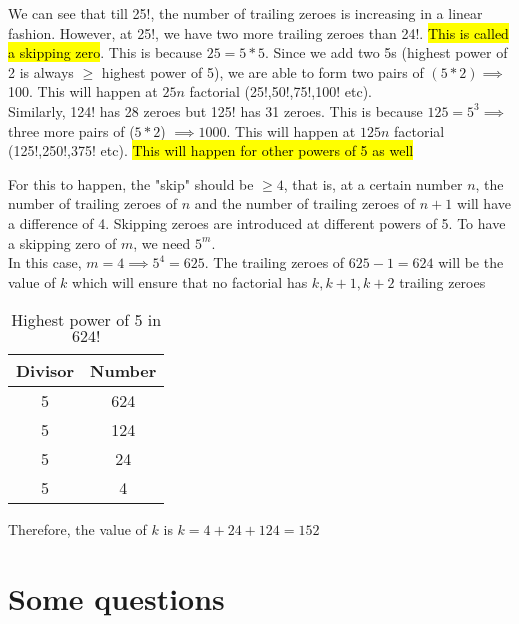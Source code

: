 We can see that till 25!, the number of trailing zeroes is increasing in a linear fashion. However, at 25!, we have two more trailing zeroes than 24!. \hl{This is called a skipping zero}. This is because $25 = 5 * 5$. Since we add two 5s (highest power of 2 is always $\geq$ highest power of 5), we are able to form two pairs of $(5 * 2) \implies $ 100. This will happen at $25n$ factorial (25!,50!,75!,100! etc). \\

Similarly, 124! has 28 zeroes but 125! has 31 zeroes. This is because $125 = 5^3 \implies $ three more pairs of ($5 * 2$) $\implies 1000$. This will happen at $125n$ factorial (125!,250!,375! etc). \hl{This will happen for other powers of 5 as well}


For this to happen, the "skip" should be $\geq 4$, that is, at a certain number $n$, the number of trailing zeroes of $n$ and the number of trailing zeroes of $n+1$ will have a difference of 4. Skipping zeroes are introduced at different powers of 5. To have a skipping zero of $m$, we need $5^m$. \\

In this case, $m = 4 \implies 5^4 = 625$. The trailing zeroes of $625 - 1 = 624$ will be the value of $k$ which will ensure that no factorial has $k,k+1,k+2$ trailing zeroes

\begin{table}[ht!]
    \centering
    \begin{tabular}{|| c | c ||}
         \hline
         Divisor & Number  \\
         \hline
         5 & 624 \\ 
         5 & 124 \\ 
         5 & 24 \\ 
         5 & 4 \\ 
         \hline
    \end{tabular}
    \caption{Highest power of 5 in $624!$}
\end{table}

Therefore, the value of $k$ is $k = 4 + 24 + 124 = 152$

\section{Some questions}


